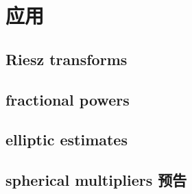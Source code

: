 \section{应用}
\label{b2:sec:2203}


\subsection{Riesz transforms}
\label{b2:subsec:220301}

\subsection{fractional powers}
\label{b2:subsec:220302}

\subsection{elliptic estimates}
\label{b2:subsec:220303}

\subsection{spherical multipliers 预告}
\label{b2:subsec:220304}


